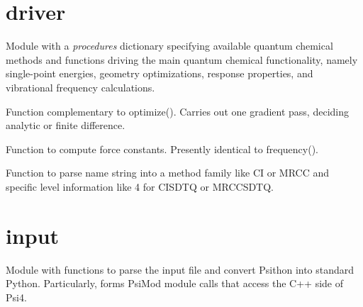 \documentclass[letterpaper,10pt,english]{sphinxmanual}
\begin{document}
\section{driver}
\label{index:module-driver}\label{index:driver}
Module with a \emph{procedures} dictionary specifying available quantum
chemical methods and functions driving the main quantum chemical
functionality, namely single-point energies, geometry optimizations,
response properties, and vibrational frequency calculations.

\begin{fulllineitems}
\label{index:driver.gradient}
Function complementary to optimize(). Carries out one gradient pass,
deciding analytic or finite difference.

\end{fulllineitems}


\begin{fulllineitems}
\label{index:driver.hessian}
Function to compute force constants. Presently identical to frequency().

\end{fulllineitems}


\begin{fulllineitems}
\label{index:driver.parse_arbitrary_order}
Function to parse name string into a method family like CI or MRCC and specific
level information like 4 for CISDTQ or MRCCSDTQ.

\end{fulllineitems}



\section{input}
\label{index:input}\label{index:module-input}
Module with functions to parse the input file and convert
Psithon into standard Python. Particularly, forms PsiMod
module calls that access the C++ side of Psi4.
\end{document}

